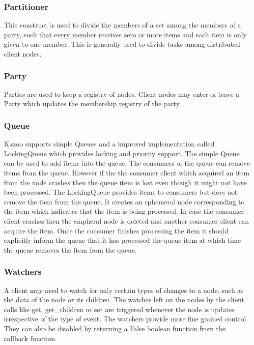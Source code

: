   \subsubsection{Partitioner}
  This construct is used to divide the members of a set among the members of a party, such that every member receives zero or more items and each item is only given to one member. This is generally used to divide tasks among distributed client nodes.
  \subsubsection{Party}
    Parties are used to keep a registry of nodes. Client nodes may enter or leave a Party which updates the membership registry of the party.
  \subsubsection{Queue}
    Kazoo supports simple Queues and a improved implementation called LockingQueue which provides locking and priority support. The simple Queue can be used to add items into the queue. The consumers of the queue can remove items from the queue. However if the the consumer client which acquired an item from the node crashes then the queue item is lost even though it might not have been processed. The LockingQueue provides items to consumers but does not remove the item from the queue. It creates an ephemeral node corresponding to the item which indicates that the item is being processed. In case the consumer client crashes then the empheral node is deleted and another consumer client can acquire the item. Once the consumer finishes processing the item it should explicitly inform the queue that it has processed the queue item at which time the queue removes the item from the queue.
  \subsubsection{Watchers}
  A client may need to watch for only certain types of changes to a node, such as the data of the node or its children. The watches left on the nodes by the client calls like get, get\_children or set are triggered whenever the node is updates irrespective of the type of event. The watchers provide more fine grained control. They can also be disabled by returning a False boolean function from the callback function.
  
